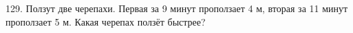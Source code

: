 129. Ползут две черепахи. Первая за 9 минут проползает 4 м, вторая за 11 минут проползает 5 м. Какая черепах ползёт быстрее?\\
